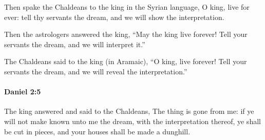 			\begin{versebox}
					\item[BHS] 
					\item[LXX] 
					\item[ASV] Then spake the Chaldeans to the king in the Syrian language, O king, live for ever: tell thy servants the dream, and we will show the interpretation.
					\item[NIV] Then the astrologers answered the king, “May the king live forever! Tell your servants the dream, and we will interpret it.”
					\item[NRSV] The Chaldeans said to the king (in Aramaic), “O king, live forever! Tell your servants the dream, and we will reveal the interpretation.”
			\end{versebox}

		\paragraph{Daniel 2:5} %
			\label{DANIEL-2-5}

			The king answered and said to the Chaldeans, The thing is gone from me: if ye will not make known unto me the dream, with the interpretation thereof, ye shall be cut in pieces, and your houses shall be made a dunghill.

